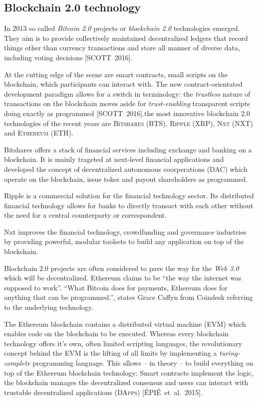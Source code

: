 \documentclass[9pt,oneside]{amsart}
\begin{document}
\begin{multicols}{2}
\subsection{Blockchain 2.0 technology}
In 2013 so called \textit{Bitcoin 2.0} projects or \textit{blockchain 2.0} technologies emerged. They aim is to provide collectively maintained decentralized ledgers that record things other than currency transactions and store all manner of diverse data, including voting decisions [SCOTT~2016].\par
At the cutting edge of the scene are smart contracts, small scripts on the blockchain, which participants can interact with. The new contract-orientated development paradigm allows for a switch in terminology: the \textit{trustless} nature of transactions on the blockchain moves aside for \textit{trust-enabling} transparent scripts doing exactly as programmed [SCOTT~2016].\parAmong the most innovative blockchain 2.0 technologies of the recent years are \textsc{Bitshares (BTS)}, \textsc{Ripple (XRP)}, \textsc{Nxt (NXT)} and \textsc{Ethereum (ETH)}.\par
Bitshares offers a stack of financial services including exchange and banking on a blockchain. It is mainly trageted at next-level financial applications and developed the concept of decentralized autonomous coorperations (\textsc{DAC}) which operate on the blockchain, issue tokes and payout shareholders as programmed.\par
Ripple is a commercial solution for the financial technology sector. Its distributed financial technology allows for banks to directly transact with each other without the need for a central counterparty or correspondent.\par
Nxt improves the financial technology, crowdfunding and governance industries by providing powerful, modular toolsets to build any application on top of the blockchain.\par
Blockchain 2.0 projects are often considered to pave the way for the \textit{Web 3.0} which will be decentralized. Ethereum claims to be \enquote{the way the internet was supposed to work}. \enquote{What Bitcoin does for payments, Ethereum does for anything that can be programmed.}, states Grace Caffyn from Coindesk referring to the underlying technology.\par
The Ethereum blockchain contains a distributed virtual machine (\textsc{EVM}) which enables code on the blockchain to be executed. Whereas every blockchain technology offers it's own, often limited scripting languages, the revolutionary concept behind the EVM is the lifting of all limits by implementing a \textit{turing-complete} programming language. This allows -- in theory -- to build everything on top of the Ethereum blockchain technology: Smart contracts implement the logic, the blockchain manages the decentralized consensus and users can interact with trustable decentralized applications (\textsc{DApps}) [ÉPIÉ~et~al.~2015].


\end{multicols}
\end{document}
